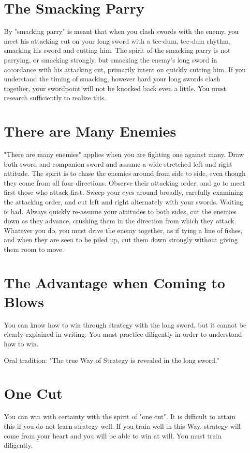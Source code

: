 \documentclass[12pt]{report}
\begin{document}
\section*{The Smacking Parry}
By "smacking parry" is meant that when you clash swords with the enemy, you meet his attacking cut on your long sword with a tee-dum, tee-dum rhythm, smacking his sword and cutting him. The spirit of the smacking parry is not parrying, or smacking strongly, but smacking the enemy's long sword in accordance with his attacking cut, primarily intent on quickly cutting him. If you understand the timing of smacking, however hard your long swords clash together, your swordpoint will not be knocked back even a little. You must research sufficiently to realize this.
\section*{There are Many Enemies}
"There are many enemies" applies when you are fighting one against many. Draw both sword and companion sword and assume a wide-stretched left and right attitude. The spirit is to chase the enemies around from side to side, even though they come from all four directions. Observe their attacking order, and go to meet first those who attack first. Sweep your eyes around broadly, carefully examining the attacking order, and cut left and right alternately with your swords. Waiting is bad. Always quickly re-assume your attitudes to both sides, cut the enemies down as they advance, crushing them in the direction from which they attack. Whatever you do, you must drive the enemy together, as if tying a line of fishes, and when they are seen to be piled up, cut them down strongly without giving them room to move.
\section*{The Advantage when Coming to Blows}
You can know how to win through strategy with the long sword, but it cannot be clearly explained in writing. You must practice diligently in order to understand how to win.

Oral tradition: "The true Way of Strategy is revealed in the long sword."
\section*{One Cut}
You can win with certainty with the spirit of "one cut". It is difficult to attain this if you do not learn strategy well. If you train well in this Way, strategy will come from your heart and you will be able to win at will. You must train diligently.
\end{document}
